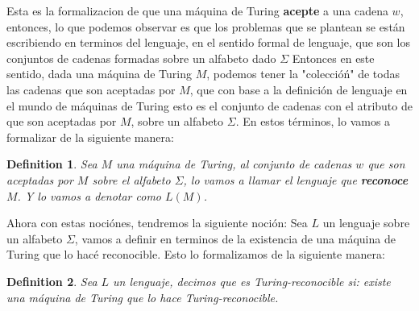 \documentclass[10pt]{report}
\newtheorem{definition}{Definition}
\begin{document}
    Esta es la formalizacion de que una máquina de Turing \textbf{acepte} a una cadena $w$,
    entonces, lo que podemos observar es que los problemas que se plantean se están
    escribiendo en terminos del lenguaje, en el sentido formal de lenguaje, que son los
    conjuntos de cadenas formadas sobre un alfabeto dado $\Sigma$
    \newpage
    Entonces en este sentido, dada una máquina de Turing $M$, podemos tener la "coleccióń" de todas
    las cadenas que son aceptadas por $M$, que con base a la definición de lenguaje en el mundo de máquinas de Turing
    esto es el conjunto de cadenas con el atributo de que son aceptadas por $M$, sobre un alfabeto $\Sigma$.
    \newline
    En estos términos, lo vamos a formalizar de la siguiente manera:
    \begin{definition}
        Sea $M$ una máquina de Turing, al conjunto de cadenas $w$ que son aceptadas por $M$ sobre el alfabeto $\Sigma$,
        lo vamos a llamar el lenguaje que \textbf{reconoce} $M$.\newline
        Y lo vamos a denotar como $L(M)$.
    \end{definition}

    Ahora con estas nociónes, tendremos la siguiente noción: \newline Sea $L$ un lenguaje sobre un alfabeto $\Sigma$,
    vamos a definir en terminos de la existencia de una máquina de Turing que lo hacé reconocible.\newline
    Esto lo formalizamos de la siguiente manera: \newline
    \begin{definition}
        Sea $L$ un lenguaje, decimos que es Turing-reconocible si:
        existe una máquina de Turing que lo hace Turing-reconocible.
    \end{definition}
\end{document}
